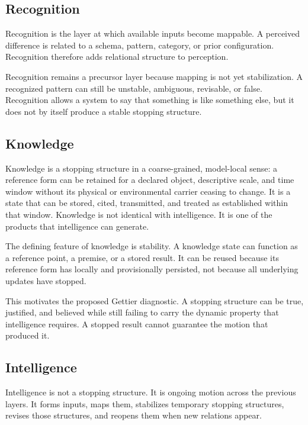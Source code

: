 \subsection{Recognition}

Recognition is the layer at which available inputs become mappable. A perceived difference is related to a schema, pattern, category, or prior configuration. Recognition therefore adds relational structure to perception.

Recognition remains a precursor layer because mapping is not yet stabilization. A recognized pattern can still be unstable, ambiguous, revisable, or false. Recognition allows a system to say that something is like something else, but it does not by itself produce a stable stopping structure.

\subsection{Knowledge}

Knowledge is a stopping structure in a coarse-grained, model-local sense: a reference form can be retained for a declared object, descriptive scale, and time window without its physical or environmental carrier ceasing to change. It is a state that can be stored, cited, transmitted, and treated as established within that window. Knowledge is not identical with intelligence. It is one of the products that intelligence can generate.

The defining feature of knowledge is stability. A knowledge state can function as a reference point, a premise, or a stored result. It can be reused because its reference form has locally and provisionally persisted, not because all underlying updates have stopped.

This motivates the proposed Gettier diagnostic. A stopping structure can be true, justified, and believed while still failing to carry the dynamic property that intelligence requires. A stopped result cannot guarantee the motion that produced it.

\subsection{Intelligence}

Intelligence is not a stopping structure. It is ongoing motion across the previous layers. It forms inputs, maps them, stabilizes temporary stopping structures, revises those structures, and reopens them when new relations appear.

